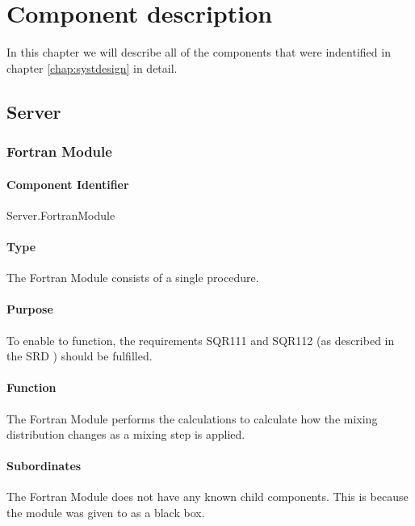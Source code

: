 \chapter{Component description}
\label{chap:compdescr}
In this chapter we will describe all of the components that were indentified in chapter \ref{chap:systdesign} in detail.

\section{Server}
\subsection{Fortran Module}

\subsubsection*{Component Identifier}
Server.FortranModule

\subsubsection*{Type}
The Fortran Module consists of a single procedure.

\subsubsection*{Purpose}
To enable \projectname to function, the requirements SQR111 and SQR112 (as described in the SRD \cite{srd}) should be fulfilled.

\subsubsection*{Function}
The Fortran Module performs the calculations to calculate how the mixing distribution changes as a mixing step is applied.

\subsubsection*{Subordinates}
The Fortran Module does not have any known child components. This is because the module was given to \projectauthor as a black box.

